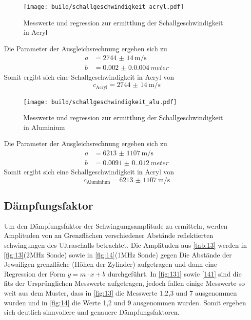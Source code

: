  \begin{figure}[H]
    \centering
    \caption{Messwerte und regression zur ermittlung der Schallgeschwindigkeit in Acryl}
    \label{fig:11}
    \texttt{[image: build/schallgeschwindigkeit\_acryl.pdf]}
\end{figure}
Die Parameter der Ausgleichsrechnung ergeben sich zu 
\begin{align*}
    a &= \qty{2744(14)}{\meter\per\second}\\
    b &= \qty{0.002(0.0004)}{meter}
\end{align*}
Somit ergibt sich eine Schallgeschwindigkeit in Acryl von 
\begin{equation}
    c_\text{Acryl} = \qty{2744(14)}{\meter\per\second}
\end{equation}

\begin{figure}[H]
    \centering
    \caption{Messwerte und regression zur ermittlung der Schallgeschwindigkeit in Aluminium}
    \label{fig:12}
    \texttt{[image: build/schallgeschwindigkeit\_alu.pdf]}
\end{figure}
Die Parameter der Ausgleichsrechnung ergeben sich zu 
\begin{align*}
    a &= \qty{6213(1107)}{\meter\per\second}\\
    b &= \qty{0.0091(0.012)}{meter}
\end{align*}
Somit ergibt sich eine Schallgeschwindigkeit in Acryl von 
\begin{equation}
    c_\text{Aluminium} = \qty{6213(1107)}{\meter\per\second}
\end{equation}

\subsection{Dämpfungsfaktor}
Um den Dämpfungsfaktor der Schwingungsamplitude zu ermitteln, werden 
Amplituden von an Grenzflächen verschiedener Abstände reflektierten schwingungen 
des Ultraschalls betrachtet. Die Amplituden aus \autoref{tab:13} werden in \autoref{fig:13}(2$\unit{\mega\hertz}$ Sonde) 
sowie in \autoref{fig:14}(1$\unit{\mega\hertz}$ Sonde) gegen Die Abstände der Jewailigen grenzfläche (Höhen der Zylinder) aufgetragen 
und dann eine Regression der Form $y = m \cdot x + b$  durchgeführt. In \autoref{fig:131} sowie \autoref{141} sind die fits der Ursprünglichen Messwerte 
aufgetragen, jedoch fallen einige Messwerte so weit aus dem Muster, dass in \autoref{fig:13} die Messwerte 
1,2,3 und 7 ausgenommen wurden und in \autoref{fig:14} die Werte 1,2 und 9 ausgenommen wurden. Somit ergeben sich deutlich sinnvollere 
und genauere Dämpfungsfaktoren.
 
